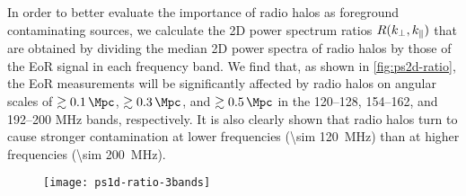 In order to better evaluate the importance of radio halos as foreground
contaminating sources, we calculate the 2D power spectrum ratios
$R(k_{\perp}, k_{\parallel})$ that are obtained by dividing the median 2D power
spectra of radio halos by those of the EoR signal in each frequency band.
We find that, as shown in \autoref{fig:ps2d-ratio}, the EoR measurements
will be significantly affected by radio halos on angular scales of
$\gtrsim \SI{0.1}{\per\Mpc}$, $\gtrsim \SI{0.3}{\per\Mpc}$, and
$\gtrsim \SI{0.5}{\per\Mpc}$ in the \numrange{120}{128},
\numrange{154}{162}, and \numrange{192}{200} \si{\MHz} bands, respectively.
It is also clearly shown that radio halos turn to cause stronger
contamination at lower frequencies (\SI{\sim 120}{\MHz}) than at higher
frequencies (\SI{\sim 200}{\MHz}).

\begin{figure}[htp]
  \centering
  \texttt{[image: ps1d-ratio-3bands]}
  \label{fig:ps1d-ratio}
\end{figure}

